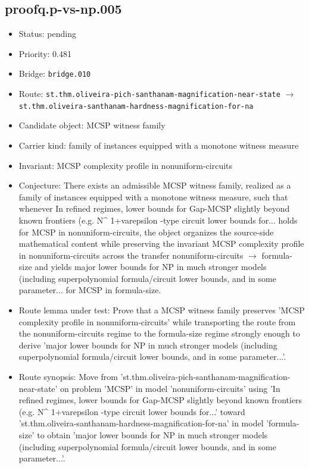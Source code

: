 \documentclass[11pt]{article}
\begin{document}
\subsection*{proofq.p-vs-np.005}
\begin{itemize}[leftmargin=*,itemsep=0.25em]
\item Status: pending
\item Priority: 0.481
\item Bridge: \texttt{bridge.010}
\item Route: \texttt{st.thm.oliveira-pich-santhanam-magnification-near-state} $\rightarrow$ \texttt{st.thm.oliveira-santhanam-hardness-magnification-for-na}
\item Candidate object: MCSP witness family
\item Carrier kind: family of instances equipped with a monotone witness measure
\item Invariant: MCSP complexity profile in nonuniform-circuits
\item Conjecture: There exists an admissible MCSP witness family, realized as a family of instances equipped with a monotone witness measure, such that whenever In refined regimes, lower bounds for Gap-MCSP slightly beyond known frontiers (e.g. N\textasciicircum{} 1+varepsilon -type circuit lower bounds for... holds for MCSP in nonuniform-circuits, the object organizes the source-side mathematical content while preserving the invariant MCSP complexity profile in nonuniform-circuits across the transfer nonuniform-circuits $\rightarrow$  formula-size and yields major lower bounds for NP in much stronger models (including superpolynomial formula/circuit lower bounds, and in some parameter... for MCSP in formula-size.
\item Route lemma under test: Prove that a MCSP witness family preserves 'MCSP complexity profile in nonuniform-circuits' while transporting the route from the nonuniform-circuits regime to the formula-size regime strongly enough to derive 'major lower bounds for NP in much stronger models (including superpolynomial formula/circuit lower bounds, and in some parameter...'.
\item Route synopsis: Move from 'st.thm.oliveira-pich-santhanam-magnification-near-state' on problem 'MCSP' in model 'nonuniform-circuits' using 'In refined regimes, lower bounds for Gap-MCSP slightly beyond known frontiers (e.g. N\textasciicircum{} 1+varepsilon -type circuit lower bounds for...' toward 'st.thm.oliveira-santhanam-hardness-magnification-for-na' in model 'formula-size' to obtain 'major lower bounds for NP in much stronger models (including superpolynomial formula/circuit lower bounds, and in some parameter...'.
\end{itemize}
\end{document}
